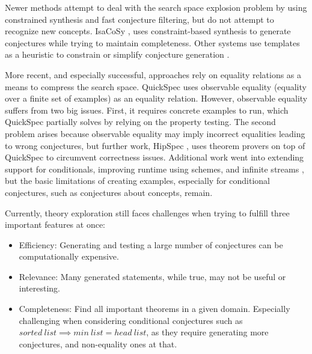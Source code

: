 Newer methods attempt to deal with the search space explosion problem by using constrained synthesis and fast conjecture filtering, but do not attempt to recognize new concepts.
IsaCoSy \cite{JAR2010:Johanssonisacosy}, uses constraint-based synthesis to generate conjectures while trying to maintain completeness.
Other systems use templates as a heuristic to constrain or simplify conjecture generation \cite{einarsdottir2020template,ESA2012:Montanoschemebased,mccasland2006mathsaid}. 

More recent, and especially successful, approaches rely on equality relations as a means to compress the search space.
QuickSpec \cite{JFP2017:Smallbonequickspec2, claessen2010quickspec1} uses observable equality (equality over a finite set of examples) as an equality relation.
However, observable equality suffers from two big issues.
First, it requires concrete examples to run, which QuickSpec partially solves by relying on the property testing. 
The second problem arises because observable equality may imply incorrect equalities leading to wrong conjectures, but further work, HipSpec \cite{hipster}, uses theorem provers on top of QuickSpec to circumvent correctness issues.
Additional work went into extending support for conditionals, improving runtime using schemes, and infinite streams \cite{ESA2012:Montanoschemebased, hipstercond, einarsdottir2020template, 2018AISC:Einarsdottir}, but the basic limitations of creating examples, especially for conditional conjectures, such as conjectures about concepts, remain.

Currently, theory exploration still faces challenges when trying to fulfill three important features at once:

\begin{itemize}
    \item Efficiency: Generating and testing a large number of conjectures can be computationally expensive.
    \item Relevance: Many generated statements, while true, may not be useful or interesting.
    \item Completeness: Find all important theorems in a given domain. Especially challenging when considering conditional conjectures such as $sorted~list \implies min~list = head~list$, as they require generating more conjectures, and non-equality ones at that.
\end{itemize}


